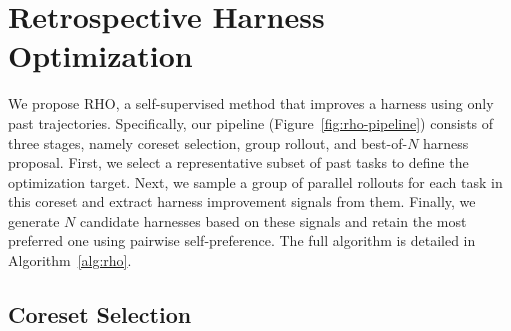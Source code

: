 \documentclass{llmxive}
\providecommand{\method}{\textsc{RHO}}
\begin{document}
\section{Retrospective Harness Optimization}

 We propose \method{}, a self-supervised method that improves a harness using only past trajectories.
Specifically, our pipeline (Figure~\ref{fig:rho-pipeline}) consists of three stages, namely coreset selection, group rollout, and best-of-$N$ harness proposal.
First, we select a representative subset of past tasks to define the optimization target.
Next, we sample a group of parallel rollouts for each task in this coreset and extract harness improvement signals from them.
Finally, we generate $N$ candidate harnesses based on these signals and retain the most preferred one using pairwise self-preference.
The full algorithm is detailed in Algorithm~\ref{alg:rho}.

\subsection{Coreset Selection}
\end{document}
